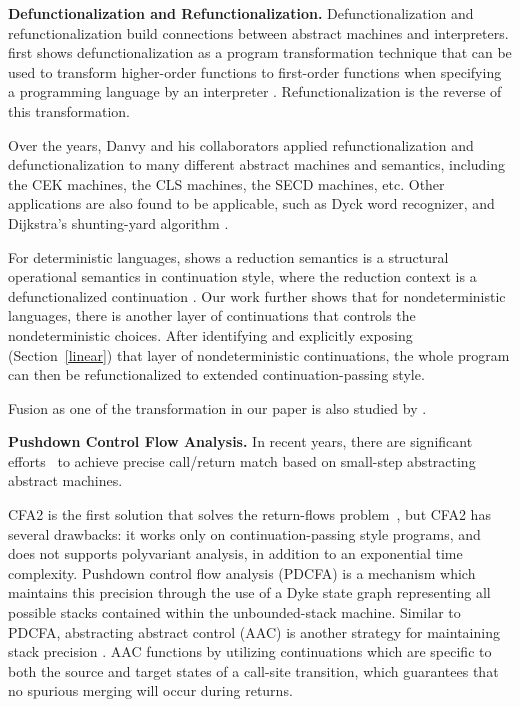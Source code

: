 \documentclass[acmsmall]{acmart}\settopmatter{}
\begin{document}
\textbf{Defunctionalization and Refunctionalization.}
Defunctionalization and refunctionalization build connections between abstract
machines and interpreters.
\citeauthor{reynolds1972definitional} first shows defunctionalization as a program transformation technique that
can be used to transform higher-order functions to first-order functions
when specifying a programming language by an interpreter \cite{reynolds1972definitional}.
Refunctionalization is the reverse of this transformation.

Over the years, Danvy and his collaborators applied refunctionalization and defunctionalization to
many different abstract machines and semantics, including the CEK machines, the CLS machines,
the SECD machines, etc.
\cite{Ager:2003:FCE:888251.888254, Danvy:2001:DW:773184.773202, danvy2004refocusing, Danvy:2008:DIP:1411204.1411206, AGER2004223, ager2005functional, Danvy:2006:RW:2171265.2171268, danvy2009towards, biernacka2009towards}
Other applications are also found to be applicable, such as Dyck word recognizer, and Dijkstra's shunting-yard algorithm \cite{Danvy:2006:RW:2171265.2171268}.

For deterministic languages, \citeauthor{Danvy:2008:DIP:1411204.1411206} shows
a reduction semantics is a structural operational semantics in continuation style,
where the reduction context is a defunctionalized continuation \cite{Danvy:2008:DIP:1411204.1411206}.
Our work further shows that for nondeterministic languages, there is another layer of continuations
that controls the nondeterministic choices. After identifying and explicitly exposing (Section~\ref{linear}) that layer
of nondeterministic continuations, the whole program can then be refunctionalized to extended continuation-passing style.

Fusion as one of the transformation in our paper is also studied by \citeauthor{Ohori:2007:LFF:1190216.1190241} \cite{Ohori:2007:LFF:1190216.1190241}.

\textbf{Pushdown Control Flow Analysis.}
In recent years, there are significant efforts~\cite{vardoulakis2010cfa2, earl2012introspective,
gilray2016pushdown, johnson2015abstracting} to achieve precise call/return
match based on small-step abstracting abstract machines.

CFA2 is the first solution that solves the return-flows problem~\cite{vardoulakis2010cfa2},
but CFA2 has several drawbacks: it works only on continuation-passing style programs,
and does not supports polyvariant analysis, in addition to an exponential time
complexity.
Pushdown control flow analysis (PDCFA) is a mechanism which maintains this precision
through the use of a Dyke state graph representing all possible stacks contained
within the unbounded-stack machine\cite{earl2012introspective, earl2010pushdown}.
Similar to PDCFA, abstracting abstract control (AAC) is another strategy for
maintaining stack precision \cite{johnson2015abstracting}.
AAC functions by utilizing continuations which are specific to both
the source and target states of a call-site transition,
which guarantees that no spurious merging will occur during returns.
\end{document}

